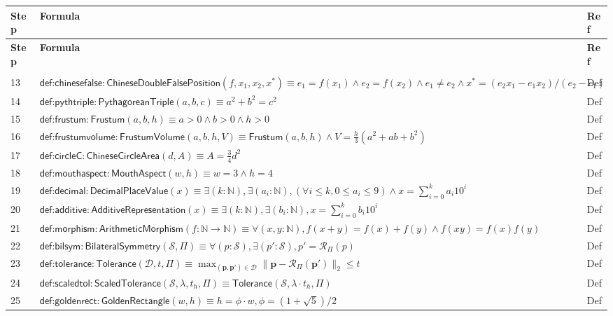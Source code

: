 \documentclass[12pt]{amsart}
\newcommand{\br}{,\allowbreak}
\newcommand{\N}{\mathbb{N}}
\newenvironment{prooftable}{%
	\renewcommand{\arraystretch}{1.2}%
	\setlength{\tabcolsep}{4pt}%
	\setlength{\arrayrulewidth}{0.05pt}
	\tiny
	\sloppy
	\begin{longtable}{
			|>{\centering\arraybackslash}m{0.7cm}|
			>{\raggedright\centering\arraybackslash}m{0.70\textwidth}|
			>{\centering\arraybackslash}m{3.5cm}|  %
		}%
		\hline
		\textbf{Step} & \centering\textbf{Formula} & \textbf{Ref} \\
		\hline
		\endfirsthead
		\hline
		\textbf{Step} & \centering\textbf{Formula} & \textbf{Ref} \\
		\hline
		\endhead
		\hline
		\multicolumn{3}{r}{\textit{Continued on next page}} \\
		\endfoot
		\hline
		\endlastfoot
	}{%
	\end{longtable}%
}
\newcommand{\thicksoliddoubleline}{%
	\noalign{\vskip1pt}%
	\noalign{\hrule height 0.2pt}%
	\noalign{\vskip0.2pt}%
	\noalign{\hrule height 0.2pt}%
	\noalign{\vskip1pt}%
}
\begin{document}
\begin{prooftable}
	\thicksoliddoubleline
	13 & $\textsf{def:chinesefalse}: \textsf{ChineseDoubleFalsePosition}(f \br x_1 \br x_2 \br x^*) \equiv e_1=f(x_1) \land e_2=f(x_2) \land e_1\ne e_2 \land x^* = (e_2 x_1 - e_1 x_2)/(e_2-e_1)$ & Def \\
	\thicksoliddoubleline
	14 & $\textsf{def:pythtriple}: \textsf{PythagoreanTriple}(a \br b \br c) \equiv a^2+b^2=c^2$ & Def \\
	\thicksoliddoubleline
	15 & $\textsf{def:frustum}: \textsf{Frustum}(a \br b \br h) \equiv a>0 \land b>0 \land h>0$ & Def \\
	\thicksoliddoubleline
	16 & $\textsf{def:frustumvolume}: \textsf{FrustumVolume}(a \br b \br h \br V) \equiv \textsf{Frustum}(a \br b \br h) \land V = \frac{h}{3}(a^2+ab+b^2)$ & Def \\
	\thicksoliddoubleline
	17 & $\textsf{def:circleC}: \textsf{ChineseCircleArea}(d \br A) \equiv A = \frac{3}{4}d^2$ & Def \\
	\thicksoliddoubleline
	18 & $\textsf{def:mouthaspect}: \textsf{MouthAspect}(w \br h) \equiv w=3 \land h=4$ & Def \\
	\thicksoliddoubleline
	19 & $\textsf{def:decimal}: \textsf{DecimalPlaceValue}(x) \equiv \exists (k:\N) \br  \exists (a_i:\N) \br  (\forall i\le k \br  0\le a_i\le9) \land x=\sum_{i=0}^k a_i 10^i$ & Def \\
	\thicksoliddoubleline
	20 & $\textsf{def:additive}: \textsf{AdditiveRepresentation}(x) \equiv \exists (k:\N) \br  \exists (b_i:\N) \br  x=\sum_{i=0}^k b_i 10^i$ & Def \\
	\thicksoliddoubleline
	21 & $\textsf{def:morphism}: \textsf{ArithmeticMorphism}(f:\N\to\N) \equiv \forall (x \br y:\N) \br  f(x+y)=f(x)+f(y) \land f(xy)=f(x)f(y)$ & Def \\
	\thicksoliddoubleline
	22 & $\textsf{def:bilsym}: \textsf{BilateralSymmetry}(\mathcal{S} \br \Pi) \equiv \forall (p:\mathcal{S}) \br  \exists (p':\mathcal{S}) \br  p'=\mathcal{R}_\Pi(p)$ & Def \\
	\thicksoliddoubleline
	23 & $\textsf{def:tolerance}: \textsf{Tolerance}(\mathcal{D} \br t \br \Pi) \equiv \max_{(\mathbf{p} \br \mathbf{p}')\in\mathcal{D}} \|\mathbf{p}-\mathcal{R}_\Pi(\mathbf{p}')\|_2 \le t$ & Def \\
	\thicksoliddoubleline
	24 & $\textsf{def:scaledtol}: \textsf{ScaledTolerance}(\mathcal{S} \br \lambda \br t_h \br \Pi) \equiv \textsf{Tolerance}(\mathcal{S} \br \lambda\cdot t_h \br \Pi)$ & Def \\
	\thicksoliddoubleline
	25 & $\textsf{def:goldenrect}: \textsf{GoldenRectangle}(w \br h) \equiv h = \phi\cdot w \br  \phi=(1+\sqrt{5})/2$ & Def \\

\end{prooftable}
\end{document}
